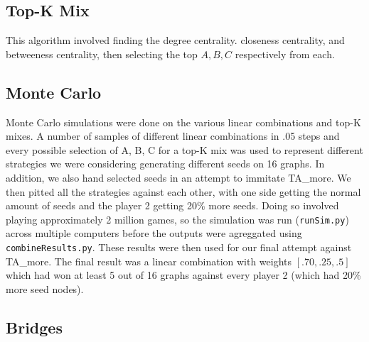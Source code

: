 \documentclass{article}
\begin{document}
\subsection*{Top-K Mix}
This algorithm involved finding the degree centrality. closeness centrality, and betweeness centrality, then selecting the top $A, B, C$ respectively from each. 

\subsection*{Monte Carlo}
Monte Carlo simulations were done on the various linear combinations and top-K mixes. A number of samples of different linear combinations in .05 steps and every possible selection of A, B, C for a top-K mix was used to represent different strategies we were considering generating different seeds on 16 graphs. In addition, we also hand selected seeds in an attempt to immitate TA\_more. We then pitted all the strategies against each other, with one side getting the normal amount of seeds and the player 2 getting 20\% more seeds. Doing so involved playing approximately 2 million games, so the simulation was run (\texttt{runSim.py}) across multiple computers before the outputs were agreggated using \texttt{combineResults.py}. These results were then used for our final attempt against TA\_more. The final result was a linear combination with weights $[.70, .25, .5]$ which had won at least 5 out of 16 graphs against every player 2 (which had 20\% more seed nodes). 

\subsection*{Bridges}
\end{document}

